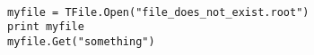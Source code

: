 \begin{footnotesize}
\begin{verbatim}

myfile = TFile.Open("file_does_not_exist.root")
print myfile
myfile.Get("something")
\end{verbatim}
\end{footnotesize}
